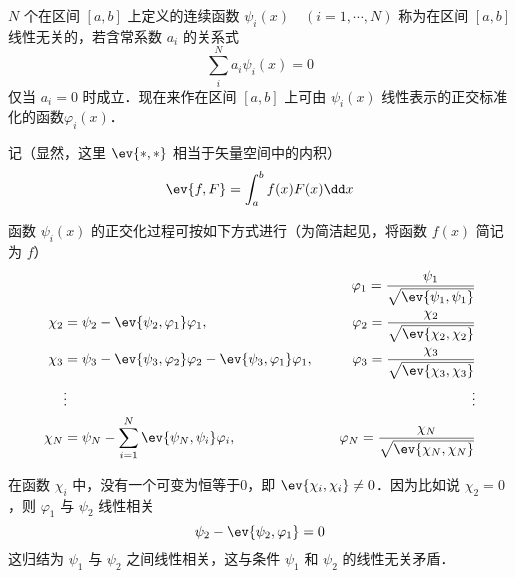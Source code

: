 $N$ 个在区间 $[a,b]$ 上定义的连续函数 $\psi_i(x)\quad (i=1,\cdots ,N)$ 称为在区间 $[a,b]$ 线性无关的，若含常系数 $a_i$ 的关系式
\begin{equation}
\sum_i^N a_i\psi_i(x)=0
\end{equation}
仅当 $a_i=0$ 时成立．现在来作在区间 $[a,b]$ 上可由 ${\psi_i(x)}$ 线性表示的正交标准化的函数${\varphi_i(x)}$．

记（显然，这里 $\ev{*,*}$ 相当于矢量空间中的内积）
\begin{equation}
\ev{f,F}=\int_a^b f(x)F(x)\dd x
\end{equation}

函数 ${\psi_i(x)}$ 的正交化过程可按如下方式进行（为简洁起见，将函数 $f(x)$ 简记为 $f$）
\begin{equation}
\begin{aligned}
&&\varphi_1=\frac{\psi_1}{\sqrt{\ev{\psi_1,\psi_1}}}\\
\chi_2&=\psi_2-\ev{\psi_2,\varphi_1}\varphi_1,\quad&\varphi_2=\frac{\chi_2}{\sqrt{\ev{\chi_2,\chi_2}}}\\
\chi_3&=\psi_3-\ev{\psi_3,\varphi_2}\varphi_2-\ev{\psi_3,\varphi_1}\varphi_1,\quad &\varphi_3=\frac{\chi_3}{\sqrt{\ev{\chi_3,\chi_3}}}\\
&\vdots &\vdots
\\
\chi_N&=\psi_N-\sum_{i=1}^N\ev{\psi_N,\psi_i}\varphi_i,\quad&\varphi_N=\frac{\chi_N}{\sqrt{\ev{\chi_N,\chi_N}}}
\end{aligned}
\end{equation}

在函数 $\chi_i$ 中，没有一个可变为恒等于0，即 $\ev{\chi_i,\chi_i}\neq 0$．因为比如说 $\chi_2=0$，则 $\varphi_1$ 与 $\psi_2$ 线性相关
\begin{equation}
\psi_2-\ev{\psi_2,\varphi_1}=0
\end{equation}
这归结为 $\psi_1$ 与 $\psi_2$ 之间线性相关，这与条件 $\psi_1$ 和 $\psi_2$ 的线性无关矛盾．